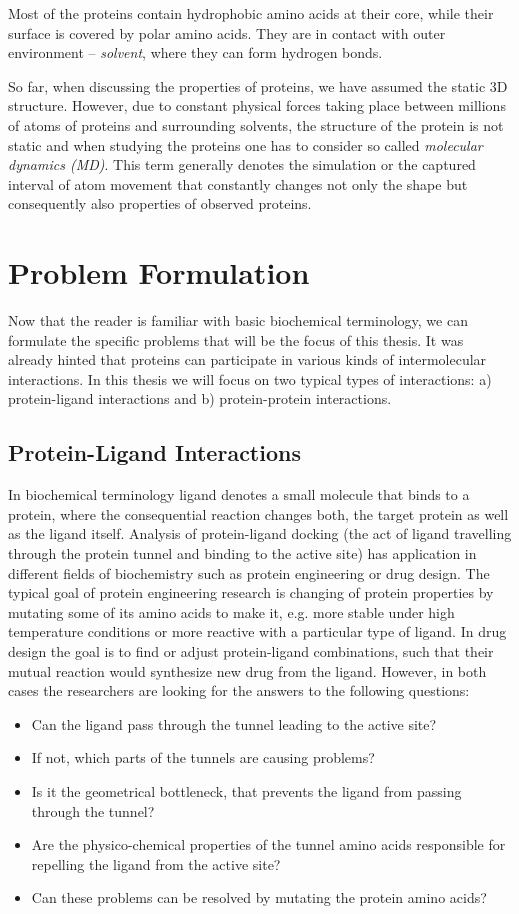 Most of the proteins contain hydrophobic amino acids at their core, while their surface is covered by polar amino acids. They are in contact with outer environment -- \textit{solvent}, where they can form hydrogen bonds.

So far, when discussing the properties of proteins, we have assumed the static 3D structure. However, due to constant physical forces taking place between millions of atoms of proteins and surrounding solvents, the structure of the protein is not static and when studying the proteins one has to consider so called \textit{molecular dynamics (MD)}. This term generally denotes the simulation or the captured interval of atom movement that constantly changes not only the shape but consequently also properties of observed proteins. 

\section{Problem Formulation}
Now that the reader is familiar with basic biochemical terminology, we can formulate the specific problems that will be the focus of this thesis. It was already hinted that proteins can participate in various kinds of intermolecular interactions. In this thesis we will focus on two typical types of interactions: a) protein-ligand interactions and b) protein-protein interactions.

\subsection{Protein-Ligand Interactions} 
In biochemical terminology ligand denotes a small molecule that binds to a protein, where the consequential reaction changes both, the target protein as well as the ligand itself. Analysis of protein-ligand docking (the act of ligand travelling through the protein tunnel and binding to the active site) has application in different fields of biochemistry such as protein engineering or drug design. The typical goal of protein engineering research is changing of protein properties by mutating some of its amino acids to make it, e.g. more stable under high temperature conditions or more reactive with a particular type of ligand. In drug design the goal is to find or adjust protein-ligand combinations, such that their mutual reaction would synthesize new drug from the ligand.
However, in both cases the researchers are looking for the answers to the following questions:
\begin{itemize}
\setlength\itemsep{0.5pt}
\item{Can the ligand pass through the tunnel leading to the active site?}
\item{If not, which parts of the tunnels are causing problems?}
\item{Is it the geometrical bottleneck, that prevents the ligand from passing through the tunnel?}
\item{Are the physico-chemical properties of the tunnel amino acids responsible for repelling the ligand from the active site?}
\item{Can these problems can be resolved by mutating the protein amino acids?}
\end{itemize}

